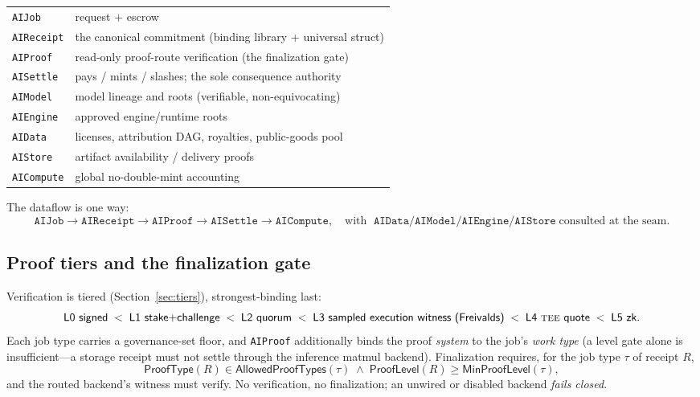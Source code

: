 \begin{center}\small
\begin{tabular}{@{}ll@{}}
\toprule
\texttt{AIJob}     & request $+$ escrow \\
\texttt{AIReceipt} & the canonical commitment (binding library + universal struct) \\
\texttt{AIProof}   & read-only proof-route verification (the finalization gate) \\
\texttt{AISettle}  & pays / mints / slashes; the sole consequence authority \\
\texttt{AIModel}   & model lineage and roots (verifiable, non-equivocating) \\
\texttt{AIEngine}  & approved engine/runtime roots \\
\texttt{AIData}    & licenses, attribution DAG, royalties, public-goods pool \\
\texttt{AIStore}   & artifact availability / delivery proofs \\
\texttt{AICompute} & global no-double-mint accounting \\
\bottomrule
\end{tabular}
\end{center}

The dataflow is one way:
\[
\texttt{AIJob}\rightarrow\texttt{AIReceipt}\rightarrow\texttt{AIProof}
\rightarrow\texttt{AISettle}\rightarrow\texttt{AICompute},
\quad\text{with }\;
\texttt{AIData}/\texttt{AIModel}/\texttt{AIEngine}/\texttt{AIStore}\;\text{consulted at the seam.}
\]

\subsection{Proof tiers and the finalization gate}
\label{sec:rs-tiers}

Verification is tiered (Section~\ref{sec:tiers}), strongest-binding last:
\[
\textsf{L0 signed}\;<\;\textsf{L1 stake+challenge}\;<\;\textsf{L2 quorum}\;<\;
\textsf{L3 sampled execution witness (Freivalds)}\;<\;\textsf{L4 \textsc{tee}{} quote}\;<\;
\textsf{L5 zk}.
\]
Each job type carries a governance-set floor, and \texttt{AIProof} additionally binds
the proof \emph{system} to the job's \emph{work type} (a level gate alone is
insufficient---a storage receipt must not settle through the inference matmul
backend). Finalization requires, for the job type $\tau$ of receipt $R$,
\[
\textsf{ProofType}(R)\in\textsf{AllowedProofTypes}(\tau)\;\wedge\;
\textsf{ProofLevel}(R)\ge\textsf{MinProofLevel}(\tau),
\]
and the routed backend's witness must verify. No verification, no finalization; an
unwired or disabled backend \emph{fails closed}.

